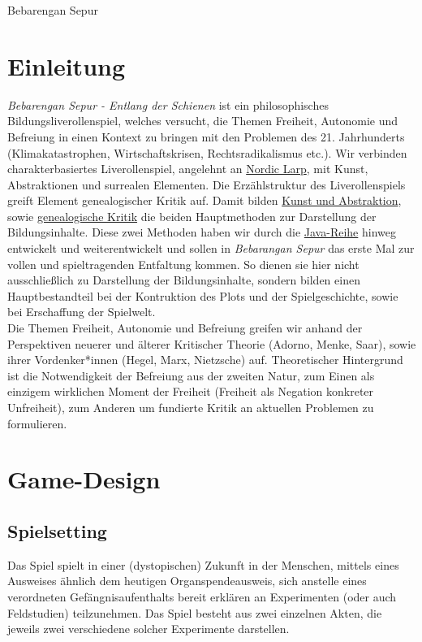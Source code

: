 \documentclass[a4paper, 12pt]{scrartcl}
\begin{document}
    \begin{titlepage}
        \begin{center}
            \large{Bebarengan Sepur}
        \end{center}
    \end{titlepage}
    \tableofcontents

    \newpage

    \section{Einleitung}
    \textit{Bebarengan Sepur - Entlang der Schienen} ist ein philosophisches Bildungsliverollenspiel, welches versucht, die Themen Freiheit, Autonomie und Befreiung in einen Kontext zu bringen mit den Problemen des 21. Jahrhunderts (Klimakatastrophen, Wirtschaftskrisen, Rechtsradikalismus etc.). 
    Wir verbinden charakterbasiertes Liverollenspiel, angelehnt an \hyperref[nordic-larp]{Nordic Larp}, mit Kunst, Abstraktionen und surrealen Elementen. 
    Die Erzählstruktur des Liverollenspiels greift Element genealogischer Kritik auf. 
    Damit bilden \hyperref[kunst-abstraktion]{Kunst und Abstraktion}, sowie \hyperref[genealogische-kritik]{genealogische Kritik} die beiden Hauptmethoden zur Darstellung der Bildungsinhalte. 
    Diese zwei Methoden haben wir durch die \hyperref[java-reihe]{Java-Reihe} hinweg entwickelt und weiterentwickelt und sollen in \textit{Bebarangan Sepur} das erste Mal zur vollen und spieltragenden Entfaltung kommen. 
    So dienen sie hier nicht ausschließlich zu Darstellung der Bildungsinhalte, sondern bilden einen Hauptbestandteil bei der Kontruktion des Plots und der Spielgeschichte, sowie bei Erschaffung der Spielwelt.\\
    Die Themen Freiheit, Autonomie und Befreiung greifen wir anhand der Perspektiven neuerer und älterer Kritischer Theorie (Adorno, Menke, Saar), sowie ihrer Vordenker*innen (Hegel, Marx, Nietzsche) auf. 
    Theoretischer Hintergrund ist die Notwendigkeit der Befreiung aus der zweiten Natur, zum Einen als einzigem wirklichen Moment der Freiheit (Freiheit als Negation konkreter Unfreiheit), zum Anderen um fundierte Kritik an aktuellen Problemen zu formulieren.

    \section{Game-Design}
    \subsection{Spielsetting}
    Das Spiel spielt in einer (dystopischen) Zukunft in der Menschen, mittels eines Ausweises \"ahnlich dem heutigen Organspendeausweis, sich anstelle eines verordneten Gefängnisaufenthalts bereit erkl\"aren an Experimenten (oder auch \glqq Feldstudien\grqq) teilzunehmen. 
    Das Spiel besteht aus zwei einzelnen \glqq Akten\grqq, die jeweils zwei verschiedene solcher Experimente darstellen.
\end{document}
